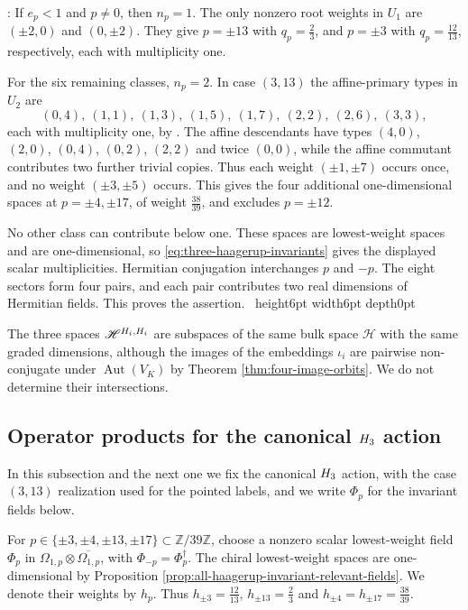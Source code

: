 \documentclass[leqno]{article}
\let\cal\relax
\newcommand{\cal}{\mathcal}
\newcommand{\Z}{\ensuremath{\mathbb{Z}}}
\newcommand{\qed}{\hfill \vrule height6pt  width6pt depth0pt}
\newcommand{\ot}{\otimes}
\newenvironment{proof}[1][]{\noindent {\it Proof #1} : }{\hbox{~}\qed
\smallskip
}
\numberwithin{equation}{section}
\begin{document}
\begin{proof}
If $e_p<1$ and $p\neq0$, then $n_p = 1$. The only nonzero root weights in $U_1$ are $(\pm2,0)$ and $(0,\pm2)$. They give $p = \pm13$ with $q_p = \frac23$, and $p = \pm3$ with $q_p = \frac{12}{13}$, respectively, each with multiplicity one.

For the six remaining classes, $n_p = 2$. In case $(3,13)$ the affine-primary types in $U_2$ are
\[
(0,4),\ (1,1),\ (1,3),\ (1,5),\ (1,7),\ (2,2),\ (2,6),\ (3,3),
\]
each with multiplicity one, by \cite[Theorem 10.5 p.~30]{Arh26a}. The affine descendants have types $(4,0)$, $(2,0)$, $(0,4)$, $(0,2)$, $(2,2)$ and twice $(0,0)$, while the affine commutant contributes two further trivial copies. Thus each weight $(\pm1,\pm7)$ occurs once, and no weight $(\pm3,\pm5)$ occurs. This gives the four additional one-dimensional spaces at $p = \pm4,\pm17$, of weight $\frac{38}{39}$, and excludes $p = \pm12$.

No other class can contribute below one. These spaces are lowest-weight spaces and are one-dimensional, so \eqref{eq:three-haagerup-invariants} gives the displayed scalar multiplicities. Hermitian conjugation interchanges $p$ and $-p$. The eight sectors form four pairs, and each pair contributes two real dimensions of Hermitian fields. This proves the assertion.
\end{proof}

The three spaces $\mathscr H^{\cal H_i,\cal H_i}$ are subspaces of the same bulk space $\mathscr H$ with the same graded dimensions, although the images of the embeddings $\iota_i$ are pairwise non-conjugate under $\operatorname{Aut}(V_K)$ by Theorem \ref{thm:four-image-orbits}. We do not determine their intersections.
\subsection{Operator products for the canonical \texorpdfstring{$\cal H_3$}{H3} action}
\label{subsec:invariant-relevant-ope}

In this subsection and the next one we fix the canonical $\cal H_3$ action, with the case $(3,13)$ realization used for the pointed labels, and we write $\Phi_p$ for the invariant fields below.

For $p \in \{\pm3,\pm4,\pm13,\pm17\} \subset \Z/39\Z$, choose a nonzero scalar lowest-weight field $\Phi_p$ in $\Omega_{1,p} \ot \overline{\Omega_{1,p}}$, with $\Phi_{-p} = \Phi_p^\dagger$. The chiral lowest-weight spaces are one-dimensional by Proposition \ref{prop:all-haagerup-invariant-relevant-fields}. We denote their weights by $h_p$. Thus $h_{\pm3} = \frac{12}{13}$, $h_{\pm13} = \frac23$ and $h_{\pm4} = h_{\pm17} = \frac{38}{39}$.
\end{document}
